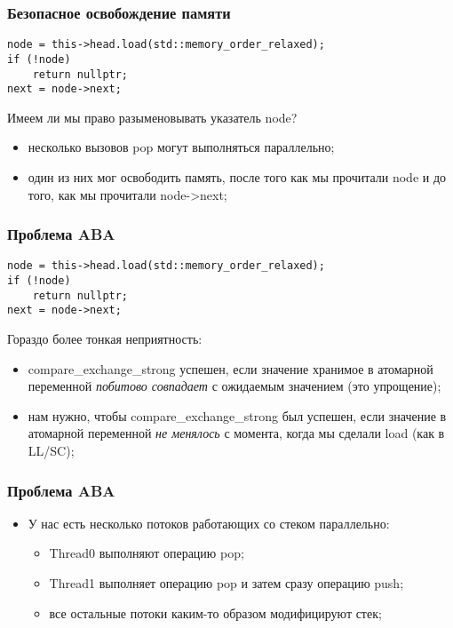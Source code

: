 \begin{frame}[fragile]
\frametitle{Безопасное освобождение памяти}

\begin{lstlisting}
node = this->head.load(std::memory_order_relaxed);
if (!node)
    return nullptr;
next = node->next;
\end{lstlisting}
Имеем ли мы право разыменовывать указатель node?
\begin{itemize}
  \item несколько вызовов pop могут выполняться параллельно;
  \item один из них мог освободить память, после того как мы прочитали node и до того, как мы прочитали node->next;
\end{itemize}
\end{frame}

\begin{frame}[fragile]
\frametitle{Проблема ABA}
\begin{lstlisting}
node = this->head.load(std::memory_order_relaxed);
if (!node)
    return nullptr;
next = node->next;
\end{lstlisting}
Гораздо более тонкая неприятность:
\begin{itemize}
  \item<1-> compare\_exchange\_strong успешен, если значение хранимое в атомарной переменной \emph{побитово совпадает} с ожидаемым значением (это упрощение);
  \item<2-> нам нужно, чтобы compare\_exchange\_strong был успешен, если значение в атомарной переменной \emph{не менялось} с момента, когда мы сделали load (как в LL/SC);
\end{itemize}
\end{frame}

\begin{frame}
\frametitle{Проблема ABA}

\begin{itemize}
  \item У нас есть несколько потоков работающих со стеком параллельно:
    \begin{itemize}
      \item Thread0 выполняют операцию pop;
      \item Thread1 выполняет операцию pop и затем сразу операцию push;
      \item все остальные потоки каким-то образом модифицируют стек;
    \end{itemize}
\end{itemize}
\end{frame}

